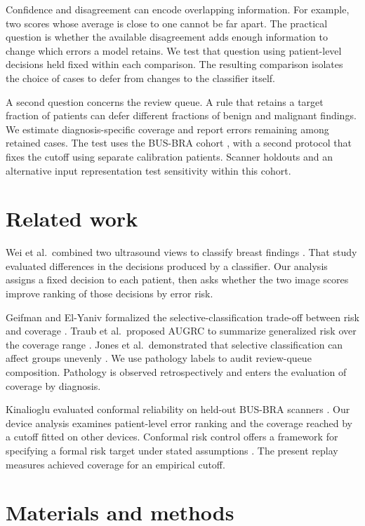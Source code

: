 \documentclass[11pt]{article}
\begin{document}
Confidence and disagreement can encode overlapping information. For example, two scores whose average is close to one cannot be far apart. The practical question is whether the available disagreement adds enough information to change which errors a model retains. We test that question using patient-level decisions held fixed within each comparison. The resulting comparison isolates the choice of cases to defer from changes to the classifier itself.

A second question concerns the review queue. A rule that retains a target fraction of patients can defer different fractions of benign and malignant findings. We estimate diagnosis-specific coverage and report errors remaining among retained cases. The test uses the BUS-BRA cohort \cite{busbra}, with a second protocol that fixes the cutoff using separate calibration patients. Scanner holdouts and an alternative input representation test sensitivity within this cohort.

\section{Related work}
Wei et al.\ combined two ultrasound views to classify breast findings \cite{wei}. That study evaluated differences in the decisions produced by a classifier. Our analysis assigns a fixed decision to each patient, then asks whether the two image scores improve ranking of those decisions by error risk.

Geifman and El-Yaniv formalized the selective-classification trade-off between risk and coverage \cite{geifman}. Traub et al.\ proposed AUGRC to summarize generalized risk over the coverage range \cite{traub}. Jones et al.\ demonstrated that selective classification can affect groups unevenly \cite{jones}. We use pathology labels to audit review-queue composition. Pathology is observed retrospectively and enters the evaluation of coverage by diagnosis.

Kinalioglu evaluated conformal reliability on held-out BUS-BRA scanners \cite{kinalioglu}. Our device analysis examines patient-level error ranking and the coverage reached by a cutoff fitted on other devices. Conformal risk control offers a framework for specifying a formal risk target under stated assumptions \cite{angelopoulos}. The present replay measures achieved coverage for an empirical cutoff.

\section{Materials and methods}
\end{document}
